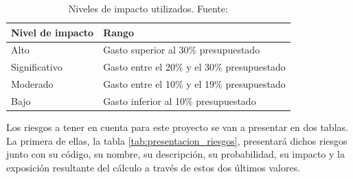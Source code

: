 \documentclass{subfiles}
\begin{document}
\begin{table}[ht]
\centering
\begin{tabular}{ll}
\hline
\textbf{Nivel de impacto} & \textbf{Rango}                              \\ \hline
Alto                      & Gasto superior al 30\% presupuestado        \\ \hline
Significativo             & Gasto entre el 20\% y el 30\% presupuestado \\ \hline
Moderado                  & Gasto entre el 10\% y el 19\% presupuestado \\ \hline
Bajo                      & Gasto inferior al 10\% presupuestado        \\ \hline
\end{tabular}
\caption[Niveles de impacto utilizados]{Niveles de impacto utilizados. Fuente: }
\label{tab:impacto_de_riesgos}
\end{table}

        Los riesgos a tener en cuenta para este proyecto se van a presentar en dos tablas. La primera de ellas, la tabla \ref{tab:presentacion_riesgos}, presentará dichos riesgos junto con su código, su nombre, su descripción, su probabilidad, su impacto y la exposición resultante del cálculo a través de estos dos últimos valores.

\end{document}
